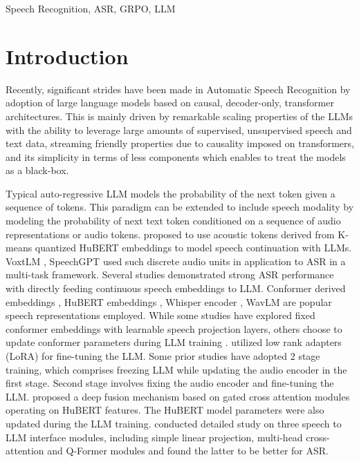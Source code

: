 \documentclass[conference]{IEEEtran}
\begin{document}
\begin{IEEEkeywords}
Speech Recognition, ASR, GRPO, LLM
\end{IEEEkeywords}

\section{Introduction}
Recently, significant strides have been made in Automatic Speech Recognition by adoption of large language models based on causal, decoder-only, transformer architectures.
This is mainly driven by remarkable scaling properties of the LLMs with the ability to leverage large amounts of supervised, unsupervised speech and text data, streaming friendly properties due to causality imposed on transformers, and its simplicity in terms of less components which enables to treat the models as a black-box.

Typical auto-regressive LLM models the probability of the next token given a sequence of tokens.
This paradigm can be extended to include speech modality by modeling the probability of next text token conditioned on a sequence of audio representations or audio tokens.
\cite{lakhotia2021generative} proposed to use acoustic tokens derived from K-means quantized HuBERT embeddings to model speech continuation with LLMs.
VoxtLM \cite{maiti2023voxtlm}, SpeechGPT \cite{zhang2023speechgpt} used such discrete audio units in application to ASR in a multi-task framework.
Several studies \cite{du2023lauragpt, ma2024embarrassingly, wu2023decoder, chu2023qwen, tang2023salmonn, yu2024connecting, fathullah2024prompting} demonstrated strong ASR performance with directly feeding continuous speech embeddings to LLM.
Conformer derived embeddings \cite{du2023lauragpt, wu2023decoder, fathullah2024prompting}, HuBERT embeddings \cite{li2023prompting}, Whisper encoder \cite{ma2024embarrassingly, chu2023qwen, tang2023salmonn, yu2024connecting}, WavLM \cite{ma2024embarrassingly} are popular speech representations employed.
While some studies have explored fixed conformer embeddings \cite{wu2023decoder} with learnable speech projection layers, others choose to update conformer parameters during LLM training \cite{li2023prompting, chu2023qwen}.
\cite{wu2023decoder, tang2023salmonn, fathullah2024prompting} utilized low rank adapters (LoRA) for fine-tuning the LLM.
Some prior studies \cite{chu2023qwen} have adopted 2 stage training, which comprises freezing LLM while updating the audio encoder in the first stage. Second stage involves fixing the audio encoder and fine-tuning the LLM.
\cite{li2023prompting} proposed a deep fusion mechanism based on gated cross attention modules operating on HuBERT features. The HuBERT model parameters were also updated during the LLM training.
\cite{yu2024connecting} conducted detailed study on three speech to LLM interface modules, including simple linear projection, multi-head cross-attention and Q-Former modules and found the latter to be better for ASR.
\end{document}
